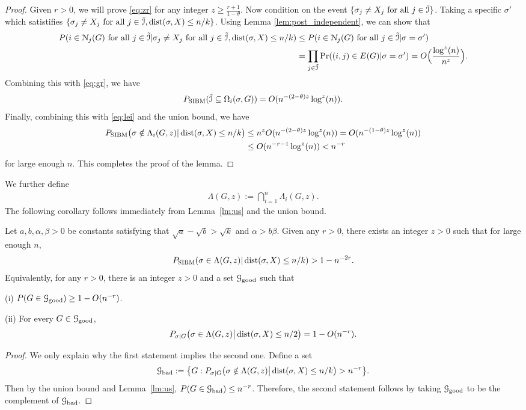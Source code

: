 \documentclass{article}
\begin{document}
\begin{proof}
	Given $r>0$, we will prove \eqref{eq:zr} for any integer $z\ge \frac{r+1}{1-\theta}$. 
	Now condition on the event $\{\sigma_j \neq X_j \text{~for all~} j\in \tilde{\mathcal{I}}\}$.
	Taking a specific $\sigma'$ which satistifies  $\{\sigma_j \neq X_j \text{~for all~} j \in \tilde{\mathcal{I}}, \operatorname{dist}(\sigma, X) \le n/k\}$.
	Using Lemma \ref{lem:post_independent}, we can show that
	\begin{align*}
	P(i\in\mathcal{N}_j(G) \text{~for all~} j\in \tilde{\mathcal{I}} | \sigma_j \neq X_j \text{~for all~} j \in \tilde{\mathcal{I}}, \operatorname{dist}(\sigma, X) \le n/k) &\leq P(i\in\mathcal{N}_j(G) \text{~for all~} j\in \tilde{\mathcal{I}} | \sigma =\sigma')\\
	&=\prod_{j\in \tilde{\mathcal{I}}}\Pr((i,j)\in E(G) | \sigma = \sigma') =  O\Big( \frac{\log^z(n)}{n^z} \Big) .
	\end{align*}
	Combining this with \eqref{eq:gr}, we have
	$$
	P_{\operatorname{SIBM}} (\tilde{\mathcal{I}} \subseteq \Omega_i(\sigma,G))
	= O (n^{-(2-\theta)z}\log^z(n)) .
	$$
	Finally, combining this with \eqref{eq:lei} and the union bound, we have
	\begin{align*}
	P_{\operatorname{SIBM}} \big(\sigma\notin \Lambda_i(G, z)
	| \operatorname{dist}(\sigma, X) \le n/k \big)
	& \le n^z O (n^{-(2-\theta)z}\log^z(n))
	= O (n^{-(1-\theta)z}\log^z(n))  \\
	& \le O (n^{-r-1}\log^z(n)) <n^{-r}
	\end{align*}
	for large enough $n$. This completes the proof of the lemma.
\end{proof}
We further define 
\begin{align*}
\Lambda(G, z) :=
\bigcap_{i=1}^n
\Lambda_i(G, z) .
\end{align*}
The following corollary follows immediately from Lemma~\ref{lm:us} and the union bound.
\begin{corollary} \label{cr:1}
	Let $a,b,\alpha,\beta> 0$ be constants satisfying that $\sqrt{a}-\sqrt{b} > \sqrt{k}$ and $\alpha>b\beta$.
	Given any $r>0$, there exists an integer $z>0$ such that for large enough $n$, 
	$$
	P_{\operatorname{SIBM}} (\sigma\in \Lambda(G, z)
	| \operatorname{dist}(\sigma, X) \le n/k)
	> 1 - n^{-2r} .
	$$
	Equivalently, for any $r>0$, there is an integer $z>0$ and a set $\mathcal{G}_{\operatorname{good}}$ such that
	
	\noindent (i)
	$P(G\in\mathcal{G}_{\operatorname{good}}) \ge 1- O(n^{-r})$.
	
	\noindent (ii) For every $G\in\mathcal{G}_{\operatorname{good}}$,
	$$
	P_{\sigma|G} \big( \sigma \in  \Lambda(G, z)  \big| \operatorname{dist}(\sigma, X) \le n/2 \big) =1- O(n^{-r}).
	$$
\end{corollary}
\begin{proof}
	We only explain why the first statement implies the second one.
	Define a set 
	$$
	\mathcal{G}_{\operatorname{bad}}:= \big\{ G: P_{\sigma|G} \big( \sigma \notin  \Lambda(G, z)  \big| \operatorname{dist}(\sigma, X) \le n/k \big)
	>n^{-r} \big\} .
	$$
	Then by the union bound and Lemma~\ref{lm:us}, $P(G\in\mathcal{G}_{\operatorname{bad}})\le n^{-r}$. Therefore, the second statement follows by taking $\mathcal{G}_{\operatorname{good}}$ to be the complement of $\mathcal{G}_{\operatorname{bad}}$.
\end{proof}
\end{document}

